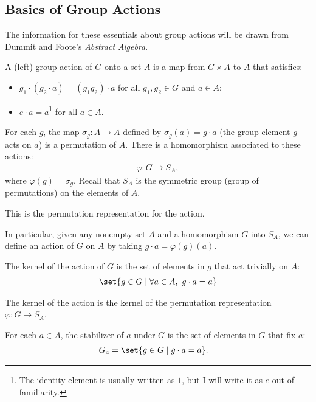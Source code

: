 \documentclass[10pt]{mypackage}
\begin{document}
\subsection{Basics of Group Actions}%
The information for these essentials about group actions will be drawn from Dummit and Foote's \textit{Abstract Algebra}.
\begin{definition}
  A (left) group action of $G$ onto a set $A$ is a map from $G\times A$ to $A$ that satisfies:
  \begin{itemize}
    \item $g_1\cdot \left(g_2\cdot a\right) = \left(g_1g_2\right)\cdot a$ for all $g_1,g_2\in G$ and $a\in A$;
    \item $e\cdot a = a$\footnote{The identity element is usually written as $1$, but I will write it as $e$ out of familiarity.} for all $a\in A$.
  \end{itemize}
\end{definition}
\begin{definition}
  For each $g$, the map $\sigma_g: A\rightarrow A$ defined by $\sigma_g(a) = g\cdot a$ (the group element $g$ acts on $a$) is a permutation of $A$. There is a homomorphism associated to these actions:
  \begin{align*}
    \varphi: G\rightarrow S_A,
  \end{align*}
  where $\varphi(g) = \sigma_g$. Recall that $S_A$ is the symmetric group (group of permutations) on the elements of $A$. \newline

  This is the permutation representation for the action.\newline

  In particular, given any nonempty set $A$ and a homomorphism $G$ into $S_A$, we can define an action of $G$ on $A$ by taking $g\cdot a = \varphi(g)(a)$.
\end{definition}
\begin{definition}[Kernel]
  The kernel of the action of $G$ is the set of elements in $g$ that act trivially on $A$:
  \begin{align*}
    \set{g\in G\mid \forall a\in A,~g\cdot a = a}
  \end{align*}
\end{definition}
\begin{note}
  The kernel of the action is the kernel of the permutation representation $\varphi: G\rightarrow S_{A}$.
\end{note}
\begin{definition}[Stabilizer]
  For each $a\in A$, the stabilizer of $a$ under $G$ is the set of elements in $G$ that fix $a$:
  \begin{align*}
    G_a &= \set{g\in G\mid g\cdot a = a}.
  \end{align*}
\end{definition}
\end{document}
